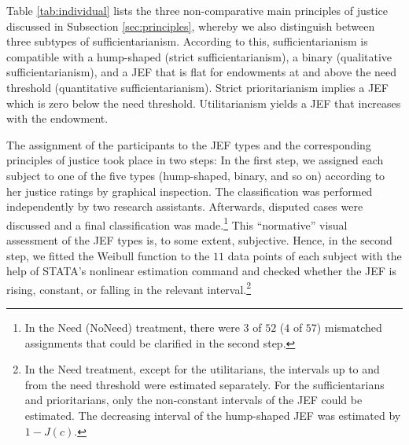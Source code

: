 \documentclass[12pt]{scrartcl}
\begin{document}
Table \ref{tab:individual} lists the three non-comparative main principles of justice discussed in Subsection \ref{sec:principles}, whereby we also distinguish between three subtypes of sufficientarianism.
According to this, sufficientarianism is compatible with a hump-shaped (strict sufficientarianism), a binary (qualitative sufficientarianism), and a JEF that is flat for endowments at and above the need threshold (quantitative sufficientarianism).
Strict prioritarianism implies a JEF which is zero below the need threshold.
Utilitarianism yields a JEF that increases with the endowment.

The assignment of the participants to the JEF types and the corresponding principles of justice took place in two steps: In the first step, we assigned each subject to one of the five types (hump-shaped, binary, and so on) according to her justice ratings by graphical inspection.
The classification was performed independently by two research assistants.
Afterwards, disputed cases were discussed and a final classification was made.\footnote{In the Need (NoNeed) treatment, there were $3$ of $52$ ($4$ of $57$) mismatched assignments that could be clarified in the second step.}
This ``normative'' visual assessment of the JEF types is, to some extent, subjective.
Hence, in the second step, we fitted the Weibull function to the $11$ data points of each subject with the help of STATA's nonlinear estimation command and checked whether the JEF is rising, constant, or falling in the relevant interval.\footnote{In the Need treatment, except for the utilitarians, the intervals up to and from the need threshold were estimated separately. For the sufficientarians and prioritarians, only the non-constant intervals of the JEF could be estimated. The decreasing interval of the hump-shaped JEF was estimated by $1-J(c)$.}
\end{document}

